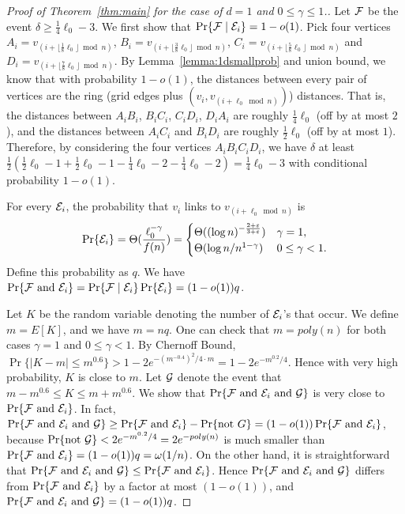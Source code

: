 \documentclass[11pt]{article}
\begin{document}
\begin{proof}
[Proof of Theorem~\ref{thm:main} for the case of $d=1$ and $0\le \gamma \le 1$.]
Let ${\cal F}$ be the event $\delta\geq\frac{1}{4}\ell_0-3$. We first show that $\Pr\{{\cal F}\mid {\cal E}_i\}=1-o(1)$.
Pick four vertices $A_i=v_{(i+\lfloor\frac{1}{8}\ell_0\rfloor\bmod n)}$, $B_i=v_{(i+\lfloor\frac{3}{8}\ell_0\rfloor\bmod n)}$, $C_i=v_{(i+\lfloor\frac{5}{8}\ell_0\rfloor\bmod n)}$ and $D_i=v_{(i+\lfloor\frac{7}{8}\ell_0\rfloor\bmod n)}$. 
By Lemma~\ref{lemma:1dsmallprob} and union bound, 
	we know that with probability $1-o(1)$, the distances between every pair 
	of vertices are the ring (grid edges plus $(v_i,v_{(i+\ell_0\bmod n)})$) distances. That is,
	the distances between $A_i B_i$, $B_i C_i$, $C_i D_i$, $D_i A_i$ are 
	roughly $\frac{1}{4}\ell_0$ (off by at most $2$), and 
	the distances between $A_i C_i$ and $B_i D_i$ are roughly 
	$\frac{1}{2}\ell_0$ (off by at most $1$). 
Therefore, by considering the four vertices $A_i B_i C_i D_i$, 
	we have $\delta$ at least $\frac{1}{2}(\frac{1}{2}\ell_0-1+\frac{1}{2}\ell_0-1-\frac{1}{4}\ell_0-2-\frac{1}{4}\ell_0-2)=\frac{1}{4}\ell_0-3$ with 
	conditional probability $1-o(1)$.

For every ${\cal E}_i$, the probability that $v_i$ links to $v_{(i+\ell_0\bmod n)}$ is \[\Pr\{{\cal E}_i\}=\Theta(\frac{\ell_0^{-\gamma}}{f(n)})=\begin{cases}\Theta((\log n)^{-\frac{2+\varepsilon}{3+\varepsilon}}) & \gamma=1, \\ \Theta(\log n/n^{1-\gamma}) & 0\leq\gamma<1.\end{cases}\] Define this probability as $q$. We have $\Pr\{{\cal F}\text{ and }{\cal E}_i\}=\Pr\{{\cal F}\mid{\cal E}_i\}\Pr\{{\cal E}_i\}=(1-o(1))q$.

Let $K$ be the random variable denoting the number of ${\cal E}_i$'s that 
	occur.
We define $m=E[K]$, and we have $m=nq$.
One can check that $m=poly(n)$ for both cases $\gamma=1$ and $0\leq\gamma<1$. By Chernoff Bound, $\Pr\{|K-m|\leq m^{0.6}\}>1-2e^{-(m^{-0.4})^2/4\cdot m}=1-2e^{-m^{0.2}/4}$. 
Hence with very high probability, $K$ is close to $m$. Let ${\cal G}$ denote the event that $m-m^{0.6}\leq K \leq m+m^{0.6}$. We show that $\Pr\{{\cal F}\text{ and }{\cal E}_i\text{ and }{\cal G}\}$ is very close to $\Pr\{{\cal F}\text{ and }{\cal E}_i\}$. In fact, $\Pr\{{\cal F}\text{ and }{\cal E}_i\text{ and }{\cal G}\}\geq\Pr\{{\cal F}\text{ and }{\cal E}_i\}-\Pr\{\text{not }G\}=(1-o(1))\Pr\{{\cal F}\text{ and }{\cal E}_i\}$, because $\Pr\{\text{not }{\cal G}\}<2e^{-m^{0.2}/4}=2e^{-poly(n)}$ is much smaller than $\Pr\{{\cal F}\text{ and }{\cal E}_i\}=(1-o(1))q=\omega(1/n)$. On the other hand, it is straightforward that $\Pr\{{\cal F}\text{ and }{\cal E}_i\text{ and }{\cal G}\}\leq\Pr\{{\cal F}\text{ and }{\cal E}_i\}$. Hence $\Pr\{{\cal F}\text{ and }{\cal E}_i\text{ and }{\cal G}\}$ differs from $\Pr\{{\cal F}\text{ and }{\cal E}_i\}$ by a factor at most $(1-o(1))$, and $\Pr\{{\cal F}\text{ and }{\cal E}_i\text{ and }{\cal G}\}=(1-o(1))q$.


\end{proof}
\end{document}
